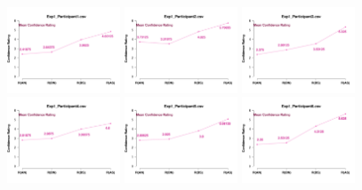 \begin{figure}[th]
\centering
\includegraphics[width=0.30\textwidth]{Figures/MirrorRating_Exp1_P1} \includegraphics[width=0.30\textwidth]{Figures/MirrorRating_Exp1_P2} \includegraphics[width=0.30\textwidth]{Figures/MirrorRating_Exp1_P3}
\includegraphics[width=0.30\textwidth]{Figures/MirrorRating_Exp1_P4} \includegraphics[width=0.30\textwidth]{Figures/MirrorRating_Exp1_P5} \includegraphics[width=0.30\textwidth]{Figures/MirrorRating_Exp1_P6}

\end{figure}
